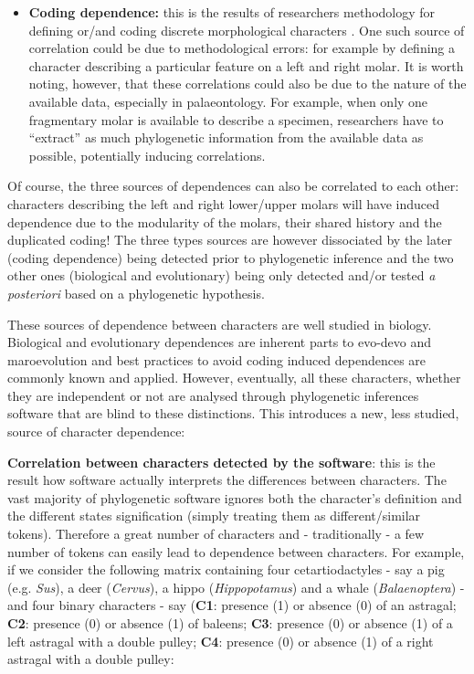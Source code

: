 \documentclass[12pt,letterpaper]{article}
\begin{document}
\begin{itemize}
    \item \textbf{Coding dependence:} this is the results of researchers methodology for defining or/and coding discrete morphological characters \citep{Brazeau2011,simoes2017giant}.
    One such source of correlation could be due to methodological errors: for example by defining a character describing a particular feature on a left and right molar.
    It is worth noting, however, that these correlations could also be due to the nature of the available data, especially in palaeontology.
    For example, when only one fragmentary molar is available to describe a specimen, researchers have to ``extract'' as much phylogenetic information from the available data as possible, potentially inducing correlations.
\end{itemize}

\noindent Of course, the three sources of dependences can also be correlated to each other: characters describing the left and right lower/upper molars will have induced dependence due to the modularity of the molars, their shared history and the duplicated coding!
The three types sources are however dissociated by the later (coding dependence) being detected prior to phylogenetic inference and the two other ones (biological and evolutionary) being only detected and/or tested \textit{a posteriori} based on a phylogenetic hypothesis.

These sources of dependence between characters are well studied in biology.
Biological and evolutionary dependences are inherent parts to evo-devo and maroevolution and best practices to avoid coding induced dependences are commonly known and applied.
However, eventually, all these characters, whether they are independent or not are analysed through phylogenetic inferences software that are blind to these distinctions.
This introduces a new, less studied, source of character dependence:

\noindent \textbf{Correlation between characters detected by the software}: this is the result how software actually interprets the differences between characters.
The vast majority of phylogenetic software ignores both the character's definition and the different states signification (simply treating them as different/similar tokens).
Therefore a great number of characters and - traditionally - a few number of tokens can easily lead to dependence between characters.
For example, if we consider the following matrix containing four cetartiodactyles - say a pig (e.g. \textit{Sus}), a deer (\textit{Cervus}), a hippo (\textit{Hippopotamus}) and a whale (\textit{Balaenoptera}) - and four binary characters - say (\textbf{C1}: presence (1) or absence (0) of an astragal; \textbf{C2}: presence (0) or absence (1) of baleens; \textbf{C3}: presence (0) or absence (1) of a left astragal with a double pulley; \textbf{C4}: presence (0) or absence (1) of a right astragal with a double pulley:
\end{document}
